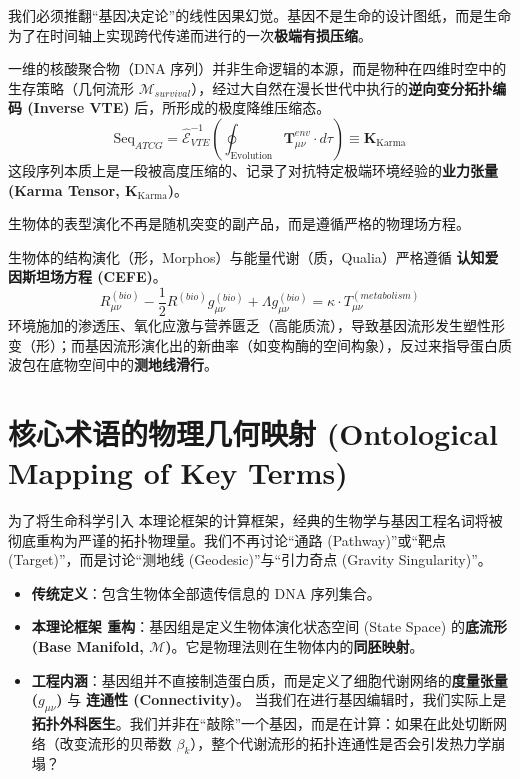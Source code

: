 我们必须推翻“基因决定论”的线性因果幻觉。基因不是生命的设计图纸，而是生命为了在时间轴上实现跨代传递而进行的一次\textbf{极端有损压缩}。

\begin{theorem}[全息降维公理]
    一维的核酸聚合物（DNA 序列）并非生命逻辑的本源，而是物种在四维时空中的生存策略（几何流形 $\mathcal{M}_{survival}$），经过大自然在漫长世代中执行的\textbf{逆向变分拓扑编码 (Inverse VTE)} 后，所形成的极度降维压缩态。
    $$ \text{Seq}_{ATCG} = \hat{\mathcal{E}}_{VTE}^{-1} \left( \oint_{\text{Evolution}} \mathbf{T}_{\mu\nu}^{env} \cdot d\tau \right) \equiv \mathbf{K}_{\text{Karma}} $$
    这段序列本质上是一段被高度压缩的、记录了对抗特定极端环境经验的\textbf{业力张量 (Karma Tensor, $\mathbf{K}_{\text{Karma}}$)}。
\end{theorem}


生物体的表型演化不再是随机突变的副产品，而是遵循严格的物理场方程。

\begin{theorem}[生物态形质互变公理]
    生物体的结构演化（形，Morphos）与能量代谢（质，Qualia）严格遵循 \textbf{认知爱因斯坦场方程 (CEFE)}。
    $$ R_{\mu\nu}^{(bio)} - \frac{1}{2}R^{(bio)} g_{\mu\nu}^{(bio)} + \Lambda g_{\mu\nu}^{(bio)} = \kappa \cdot T_{\mu\nu}^{(metabolism)} $$
    环境施加的渗透压、氧化应激与营养匮乏（高能质流），导致基因流形发生塑性形变（形）；而基因流形演化出的新曲率（如变构酶的空间构象），反过来指导蛋白质波包在底物空间中的\textbf{测地线滑行}。
\end{theorem}

\section{核心术语的物理几何映射 (Ontological Mapping of Key Terms)}
\label{sec:tb_mapping}

为了将生命科学引入 本理论框架的计算框架，经典的生物学与基因工程名词将被彻底重构为严谨的拓扑物理量。我们不再讨论“通路 (Pathway)”或“靶点 (Target)”，而是讨论“测地线 (Geodesic)”与“引力奇点 (Gravity Singularity)”。


\begin{itemize}
    \item \textbf{传统定义}：包含生物体全部遗传信息的 DNA 序列集合。
    \item \textbf{本理论框架 重构}：基因组是定义生物体演化状态空间 (State Space) 的\textbf{底流形 (Base Manifold, $\mathcal{M}$)}。它是物理法则在生物体内的\textbf{同胚映射}。
    \item \textbf{工程内涵}：基因组并不直接制造蛋白质，而是定义了细胞代谢网络的\textbf{度量张量 ($g_{\mu\nu}$)} 与 \textbf{连通性 (Connectivity)}。
    当我们在进行基因编辑时，我们实际上是\textbf{拓扑外科医生}。我们并非在“敲除”一个基因，而是在计算：如果在此处切断网络（改变流形的贝蒂数 $\beta_k$），整个代谢流形的拓扑连通性是否会引发热力学崩塌？
\end{itemize}

